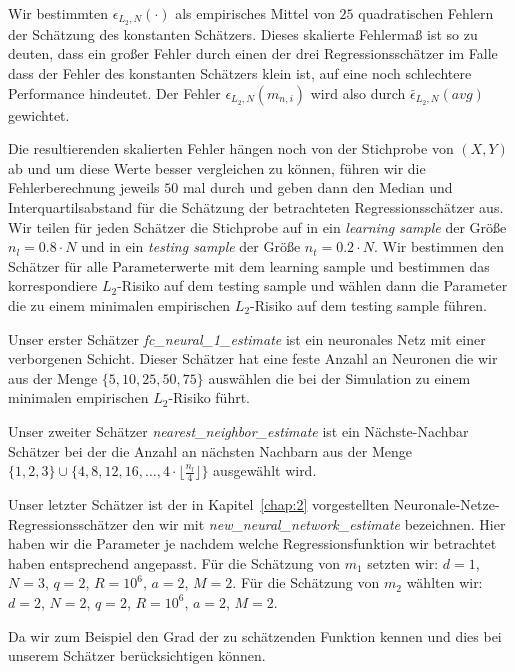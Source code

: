 {Wir bestimmten $\epsilon_{L_2,N}(\cdot)$ als empirisches Mittel von $25$ quadratischen Fehlern der Schätzung des konstanten Schätzers. Dieses skalierte Fehlermaß ist so zu deuten, dass ein großer Fehler durch einen der drei Regressionsschätzer im Falle dass der Fehler des konstanten Schätzers klein ist, auf eine noch schlechtere Performance hindeutet. Der Fehler $\epsilon_{L_2,N}(m_{n,i})$ wird also durch $\bar{\epsilon}_{L_2,N}(avg)$ gewichtet.

Die resultierenden skalierten Fehler hängen noch von der Stichprobe von $(X, Y)$ ab und um diese Werte besser vergleichen zu können, führen wir die Fehlerberechnung jeweils $50$ mal durch und geben dann den Median und Interquartilsabstand für die Schätzung der betrachteten Regressionsschätzer aus.
Wir teilen für jeden Schätzer die Stichprobe auf in ein \textit{learning sample} der Größe $n_l = 0.8 \cdot N$ und in ein \textit{testing sample} der Größe $n_t = 0.2 \cdot N$. Wir bestimmen den Schätzer für alle Parameterwerte mit dem learning sample und bestimmen das korrespondiere $L_2$-Risiko auf dem testing sample und wählen dann die Parameter die zu einem minimalen empirischen $L_2$-Risiko auf dem testing sample führen.

Unser erster Schätzer \textit{fc\_neural\_1\_estimate} ist ein neuronales Netz mit einer verborgenen Schicht. Dieser Schätzer hat eine feste Anzahl an Neuronen die wir aus der Menge $\{5, 10, 25, 50, 75\}$ auswählen die bei der Simulation zu einem minimalen empirischen $L_2$-Risiko führt.

Unser zweiter Schätzer \textit{nearest\_neighbor\_estimate} ist ein Nächste-Nachbar Schätzer bei der die Anzahl an nächsten Nachbarn aus der Menge $\{1, 2, 3\} \cup \{4, 8, 12, 16, \dots, 4 \cdot \lfloor\frac{n_l}{4}\rfloor\}$ ausgewählt wird.

Unser letzter Schätzer ist der in Kapitel~\ref{chap:2} vorgestellten Neuronale-Netze-Regressionsschätzer den wir mit \textit{new\_neural\_network\_estimate} bezeichnen. Hier haben wir die Parameter je nachdem welche Regressionsfunktion wir betrachtet haben entsprechend angepasst. Für die Schätzung von $m_1$ setzten wir: $d = 1$, $N = 3$, $q = 2$, $R = 10^6$, $a = 2$, $M = 2$.
Für die Schätzung von $m_2$ wählten wir: $d = 2$, $N = 2$, $q = 2$, $R = 10^6$, $a = 2$, $M = 2$.

Da wir zum Beispiel den Grad der zu schätzenden Funktion kennen und dies bei unserem Schätzer berücksichtigen können.

}
